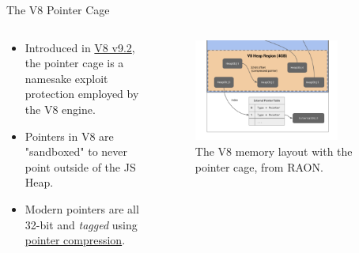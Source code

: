 \begin{frame}{The V8 Pointer Cage}
    \begin{columns}
        \begin{column}{0.35\textwidth}
            \begin{itemize}
                \item Introduced in \href{https://v8.dev/blog/v8-release-92}{\color{pink}V8 v9.2}, the pointer cage is a namesake exploit protection employed by the V8 engine.
                \item Pointers in V8 are "sandboxed" to never point outside of the JS Heap. 
                \item Modern pointers are all 32-bit and \textit{tagged} using \href{https://v8.dev/blog/pointer-compression}{\color{pink}pointer compression}.
            \end{itemize}
        \end{column}
        \begin{column}{0.65\textwidth}
            \begin{figure}
                \centering
                \includegraphics[width=0.80\textwidth]{images/v8-ptr-cage.png}
                \caption{The V8 memory layout with the pointer cage, from RAON.}
                \label{fig:v8-memory-layout}
            \end{figure}
        \end{column}
    \end{columns}
\end{frame}
